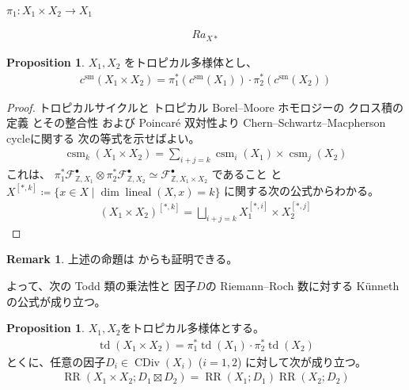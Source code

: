 \documentclass[a4paper,dvipdfmx,reqno,12pt]{amsart}
\theoremstyle{definition}
\newtheorem{proposition}[theorem]{Proposition}
\newtheorem{remark}[theorem]{Remark}
\newcommand{\deq}{\coloneqq}
\newcommand{\opn}[1]{\operatorname{#1}}
\numberwithin{equation}{section}
\begin{document}
$\pi_1\colon X_1\times X_2 \to X_1$

\begin{align}
Ra_{X*}
\end{align}

\begin{proposition}
$X_1,X_2$ をトロピカル多様体とし、
\begin{align}
c^{\mathrm{sm}}(X_1\times X_2)=
\pi^{*}_1(c^{\mathrm{sm}}(X_1))\cdot 
\pi^{*}_2(c^{\mathrm{sm}}(X_2))
\end{align}

\end{proposition}

\begin{proof}
トロピカルサイクルと
トロピカル
Borel--Moore ホモロジーの
クロス積の定義
\cite[Definition 3.7, 
Definition 4.15]{gross2019sheaftheoretic}
とその整合性
\cite[Proposition 5.9]{gross2019sheaftheoretic}
および Poincar\'e 双対性より
Chern--Schwartz--Macpherson cycleに関する
次の等式を示せばよい。
\begin{align}
\opn{csm}_k(X_1\times X_2)=\sum_{i+j=k}
\opn{csm}_{i}(X_1)\times \opn{csm}_{j}(X_2)
\end{align}
これは、
$\pi_1^{*}\mathcal{F}^{\bullet}_{\mathbb{Z},X_1}\otimes
\pi_2^{*}\mathcal{F}^{\bullet}_{\mathbb{Z},X_2}
\simeq \mathcal{F}^{\bullet}_{\mathbb{Z},X_1\times X_2}$
であること\cite[Lemma 4.14]{gross2019sheaftheoretic}
と
$X^{[*,k]}\deq \{x\in X\mid \dim \opn{lineal}(X,x)=k\}$
に関する次の公式からわかる。
\begin{align}
(X_1\times X_2)^{[*,k]}=\bigsqcup_{i+j=k}
X_1^{[*,i]}\times X_2^{[*,j]}
\end{align}

\end{proof}

\begin{remark}上述の命題は
\cite[Proposition 5.1]{demedrano2023chern}
からも証明できる。
\end{remark}

よって、次の Todd 類の乗法性と
因子$D$の Riemann--Roch 数に対する
 K\"unneth の公式が成り立つ。

\begin{proposition}
$X_1,X_2$をトロピカル多様体とする。
\begin{align}
\opn{td}(X_1\times X_2)=\pi_{1}^{*}\opn{td}(X_1)\cdot 
\pi_{2}^{*}\opn{td}(X_2)
\end{align}
とくに、任意の因子$D_i\in \opn{CDiv}(X_i)$ ($i=1,2$)
に対して次が成り立つ。
\begin{align}
\opn{RR}(X_1\times X_2;D_1\boxtimes D_2)
=\opn{RR}(X_1;D_1)\opn{RR}(X_2;D_2)
\end{align}

\end{proposition}
\end{document}
